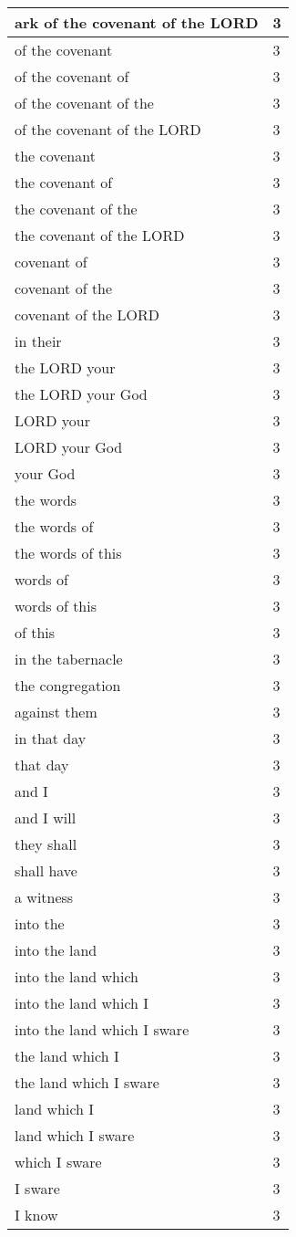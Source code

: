 \begin{center}
\begin{longtable}{|p{3.0in}|p{0.5in}|}
ark of the covenant of the LORD & 3\\ \hline 
of the covenant & 3\\ \hline 
of the covenant of & 3\\ \hline 
of the covenant of the & 3\\ \hline 
of the covenant of the LORD & 3\\ \hline 
the covenant & 3\\ \hline 
the covenant of & 3\\ \hline 
the covenant of the & 3\\ \hline 
the covenant of the LORD & 3\\ \hline 
covenant of & 3\\ \hline 
covenant of the & 3\\ \hline 
covenant of the LORD & 3\\ \hline 
in their & 3\\ \hline 
the LORD your & 3\\ \hline 
the LORD your God & 3\\ \hline 
LORD your & 3\\ \hline 
LORD your God & 3\\ \hline 
your God & 3\\ \hline 
the words & 3\\ \hline 
the words of & 3\\ \hline 
the words of this & 3\\ \hline 
words of & 3\\ \hline 
words of this & 3\\ \hline 
of this & 3\\ \hline 
in the tabernacle & 3\\ \hline 
the congregation & 3\\ \hline 
against them & 3\\ \hline 
in that day & 3\\ \hline 
that day & 3\\ \hline 
and I & 3\\ \hline 
and I will & 3\\ \hline 
they shall & 3\\ \hline 
shall have & 3\\ \hline 
a witness & 3\\ \hline 
into the & 3\\ \hline 
into the land & 3\\ \hline 
into the land which & 3\\ \hline 
into the land which I & 3\\ \hline 
into the land which I sware & 3\\ \hline 
the land which I & 3\\ \hline 
the land which I sware & 3\\ \hline 
land which I & 3\\ \hline 
land which I sware & 3\\ \hline 
which I sware & 3\\ \hline 
I sware & 3\\ \hline 
I know & 3\\ \hline 
\end{longtable}
\end{center}





